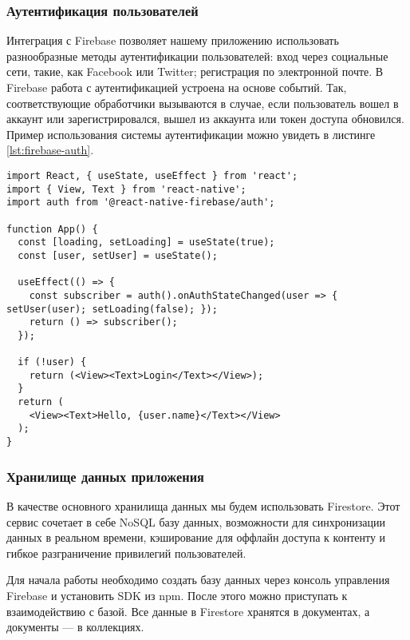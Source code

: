 \subsubsection{Аутентификация пользователей}
Интеграция с Firebase позволяет нашему приложению использовать разнообразные методы аутентификации пользователей: вход через социальные сети, такие, как Facebook или Twitter; регистрация по электронной почте. В Firebase работа с аутентификацией устроена на основе событий. Так, соответствующие обработчики вызываются в случае, если пользователь вошел в аккаунт или зарегистрировался, вышел из аккаунта или токен доступа обновился. Пример использования системы аутентификации можно увидеть в листинге \ref{lst:firebase-auth}.
\begin{lstlisting}[basicstyle=\fontsize{11}{11}\selectfont,tabsize=4,breaklines=true,caption={Пример обработки событий аутентификации.},captionpos=b,label={lst:firebase-auth}]
import React, { useState, useEffect } from 'react';
import { View, Text } from 'react-native';
import auth from '@react-native-firebase/auth';

function App() {
  const [loading, setLoading] = useState(true);
  const [user, setUser] = useState();
  
  useEffect(() => {
    const subscriber = auth().onAuthStateChanged(user => { setUser(user); setLoading(false); });
    return () => subscriber();
  });
  
  if (!user) {
    return (<View><Text>Login</Text></View>);
  }
  return (
    <View><Text>Hello, {user.name}</Text></View>
  );
}
\end{lstlisting}

\subsubsection{Хранилище данных приложения}
В качестве основного хранилища данных мы будем использовать Firestore. Этот сервис сочетает в себе NoSQL базу данных, возможности для синхронизации данных в реальном времени, кэширование для оффлайн доступа к контенту и гибкое разграничение привилегий пользователей.

Для начала работы необходимо создать базу данных через консоль управления Firebase и установить SDK из npm. После этого можно приступать к взаимодействию с базой. Все данные в Firestore хранятся в документах, а документы --- в коллекциях.


